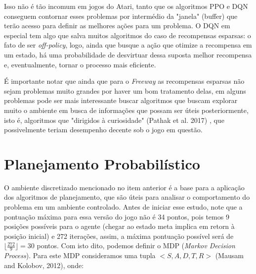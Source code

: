 \documentclass[letterpaper]{article} %
\begin{document}
Isso não é tão incomum em jogos do Atari, tanto que os algoritmos PPO e DQN conseguem contornar esses problemas por intermédio da "janela" (buffer) que terão acesso para definir as melhores ações para um problema. O DQN em especial tem algo que salva muitos algoritmos do caso de recompensas esparsas: o fato de ser \textit{off-policy}, logo, ainda que busque a ação que otimize a recompensa em um estado, há uma probabilidade de desvirtuar dessa suposta melhor recompensa e, eventualmente, tornar o processo mais eficiente.

É importante notar que ainda que para o \textit{Freeway} as recompensas esparsas não sejam problemas muito grandes por haver um bom tratamento delas, em alguns problemas pode ser mais interessante buscar algoritmos que buscam explorar muito o ambiente em busca de informações que possam ser úteis posteriormente, isto é, algoritmos que "dirigidos à curiosidade" (Pathak et al. 2017) , que possivelmente teriam desempenho decente sob o jogo em questão.


\section{Planejamento Probabilístico}
O ambiente discretizado mencionado no item anterior é a base para a aplicação dos algoritmos de planejamento, que são úteis para analisar o comportamento do problema em um ambiente controlado. Antes de iniciar esse estudo, note que a pontuação máxima para essa versão do jogo não é 34 pontos, pois temos 9 posições possíveis para o agente (chegar ao estado meta implica em retorn à posição inicial) e 272 iterações, assim, a máxima pontuação possível será de $\lfloor \frac{272}{9}\rfloor = 30$ pontos. Com isto dito, podemos definir o MDP (\textit{Markov Decision Process}). Para este MDP consideramos uma tupla $<S,A,D,T,R>$ (Mausam and Kolobov, 2012), onde: 
\end{document}
